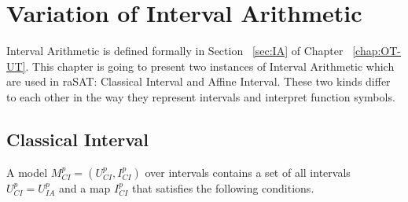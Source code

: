 \chapter{Variation of Interval Arithmetic}\label{chap:ia}
Interval Arithmetic is defined formally in Section ~\ref{sec:IA} of Chapter ~\ref{chap:OT-UT}. This chapter is going to present two instances of Interval Arithmetic which are used in raSAT: Classical Interval and Affine Interval. These two kinds differ to each other in the way they represent intervals and interpret function symbols.

\section{Classical Interval}
A model $M^p_{CI} = (U^p_{CI}, I^p_{CI})$ over intervals contains a set of all intervals $U^p_{CI} = U^p_{IA}$ and a map $I^p_{CI}$ that satisfies the following conditions.
